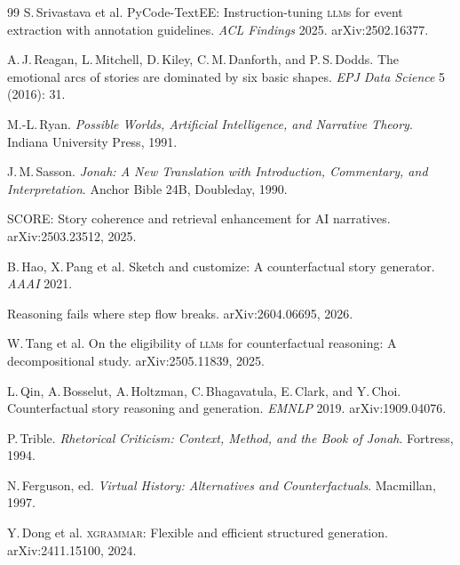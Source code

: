 \documentclass[11pt]{article}
\theoremstyle{rukha}
\begin{document}
\begin{small}
\begin{thebibliography}{99}
S.\,Srivastava et al.
\newblock PyCode-TextEE: Instruction-tuning \textsc{llm}s for event extraction with annotation guidelines.
\newblock \emph{ACL Findings} 2025.
\newblock arXiv:2502.16377.

A.\,J.\,Reagan, L.\,Mitchell, D.\,Kiley, C.\,M.\,Danforth, and P.\,S.\,Dodds.
\newblock The emotional arcs of stories are dominated by six basic shapes.
\newblock \emph{EPJ Data Science} 5 (2016): 31.

M.-L.\,Ryan.
\newblock \emph{Possible Worlds, Artificial Intelligence, and Narrative Theory}.
\newblock Indiana University Press, 1991.

J.\,M.\,Sasson.
\newblock \emph{Jonah: A New Translation with Introduction, Commentary, and Interpretation}.
\newblock Anchor Bible 24B, Doubleday, 1990.

SCORE: Story coherence and retrieval enhancement for AI narratives.
\newblock arXiv:2503.23512, 2025.

B.\,Hao, X.\,Pang et al.
\newblock Sketch and customize: A counterfactual story generator.
\newblock \emph{AAAI} 2021.

Reasoning fails where step flow breaks.
\newblock arXiv:2604.06695, 2026.

W.\,Tang et al.
\newblock On the eligibility of \textsc{llm}s for counterfactual reasoning: A decompositional study.
\newblock arXiv:2505.11839, 2025.

L.\,Qin, A.\,Bosselut, A.\,Holtzman, C.\,Bhagavatula, E.\,Clark, and Y.\,Choi.
\newblock Counterfactual story reasoning and generation.
\newblock \emph{EMNLP} 2019.
\newblock arXiv:1909.04076.

P.\,Trible.
\newblock \emph{Rhetorical Criticism: Context, Method, and the Book of Jonah}.
\newblock Fortress, 1994.

N.\,Ferguson, ed.
\newblock \emph{Virtual History: Alternatives and Counterfactuals}.
\newblock Macmillan, 1997.

Y.\,Dong et al.
\newblock \textsc{xgrammar}: Flexible and efficient structured generation.
\newblock arXiv:2411.15100, 2024.

\end{thebibliography}
\end{small}
\end{document}
